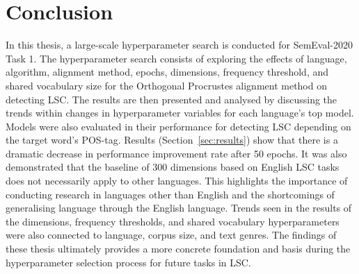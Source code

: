 \section{Conclusion}

In this thesis, a large-scale hyperparameter search is conducted for SemEval-2020 Task 1. The hyperparameter search consists of exploring the effects of language, algorithm, alignment method, epochs, dimensions, frequency threshold, and shared vocabulary size for the Orthogonal Procrustes alignment method on detecting LSC. The results are then presented and analysed by discussing the trends within changes in hyperparameter variables for each language's top model. Models were also evaluated in their performance for detecting LSC depending on the target word's POS-tag. Results (Section~\ref{sec:results}) show that there is a dramatic decrease in performance improvement rate after 50 epochs. It was also demonstrated that the baseline of 300 dimensions based on English LSC tasks does not necessarily apply to other languages. This highlights the importance of conducting research in languages other than English and the shortcomings of generalising language through the English language. Trends seen in the results of the dimensions, frequency thresholds, and shared vocabulary hyperparameters were also connected to language, corpus size, and text genres. The findings of these thesis ultimately provides a more concrete foundation and basis during the hyperparameter selection process for future tasks in LSC. 